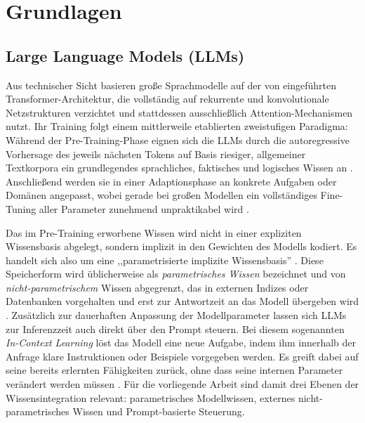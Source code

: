 %

\section{Grundlagen}
\label{sec:grundlagen}

\subsection{Large Language Models (LLMs)}
\label{sec:llms}

Aus technischer Sicht basieren große Sprachmodelle auf der von \textcite[1]{Vaswani.2017} eingeführten Trans\-for\-mer-Architektur, die vollständig auf rekurrente und konvolutionale Netzstrukturen verzichtet und stattdessen ausschließlich Attention-Mechanismen nutzt. Ihr Training folgt einem mittlerweile etablierten zweistufigen Paradigma: Während der Pre-Training-Phase eignen sich die LLMs durch die autoregressive Vorhersage des jeweils nächsten Tokens auf Basis riesiger, allgemeiner Textkorpora ein grundlegendes sprachliches, faktisches und logisches Wissen an \autocite[1:4]{Huang.2024}. Anschließend werden sie in einer Adaptionsphase an konkrete Aufgaben oder Domänen angepasst, wobei gerade bei großen Modellen ein vollständiges Fine-Tuning aller Parameter zunehmend unpraktikabel wird \autocite[1]{Hu.2022}.

Das im Pre-Training erworbene Wissen wird nicht in einer expliziten Wissensbasis abgelegt, sondern implizit in den Gewichten des Modells kodiert. Es handelt sich also um eine ,,parametrisierte implizite Wissensbasis'' \autocite[1]{Lewis.2020}. Diese Speicherform wird üblicherweise als \textit{parametrisches Wissen} bezeichnet und von \textit{nicht-parametrischem} Wissen abgegrenzt, das in externen Indizes oder Datenbanken vorgehalten und erst zur Antwortzeit an das Modell übergeben wird \autocite[1]{Lewis.2020}. Zusätzlich zur dauerhaften Anpassung der Modellparameter lassen sich LLMs zur Inferenzzeit auch direkt über den Prompt steuern. Bei diesem sogenannten \textit{In-Context Learning} löst das Modell eine neue Aufgabe, indem ihm innerhalb der Anfrage klare Instruktionen oder Beispiele vorgegeben werden. Es greift dabei auf seine bereits erlernten Fähigkeiten zurück, ohne dass seine internen Parameter verändert werden müssen \autocite[3f.]{Brown.2020}. Für die vorliegende Arbeit sind damit drei Ebenen der Wissensintegration relevant: parametrisches Modellwissen, externes nicht-parametrisches Wissen und Prompt-basierte Steuerung.

